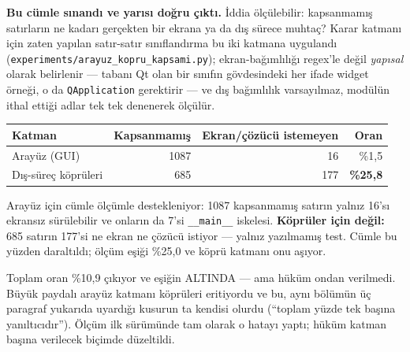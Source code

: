 \documentclass[11pt,a4paper]{article}
\begin{document}
\textbf{Bu cümle sınandı ve yarısı doğru çıktı.} İddia ölçülebilir: kapsanmamış
satırların ne kadarı gerçekten bir ekrana ya da dış sürece muhtaç? Karar katmanı
için zaten yapılan satır-satır sınıflandırma bu iki katmana uygulandı
(\texttt{experiments/arayuz\_kopru\_kapsami.py}); ekran-bağımlılığı regex'le
değil \emph{yapısal} olarak belirlenir --- tabanı Qt olan bir sınıfın gövdesindeki
her ifade widget örneği, o da \texttt{QApplication} gerektirir --- ve dış
bağımlılık varsayılmaz, modülün ithal ettiği adlar tek tek denenerek ölçülür.

\begin{center}\footnotesize
\begin{tabular}{@{}lrrr@{}}
\toprule
\textbf{Katman} & \textbf{Kapsanmamış} & \textbf{Ekran/çözücü istemeyen} & \textbf{Oran} \\
\midrule
Arayüz (GUI) & 1087 & 16 & \%1{,}5 \\
Dış-süreç köprüleri & 685 & 177 & \textbf{\%25{,}8} \\
\bottomrule
\end{tabular}
\end{center}

\noindent Arayüz için cümle ölçümle destekleniyor: 1087 kapsanmamış
satırın yalnız 16'sı ekransız sürülebilir ve onların da
7'si \texttt{\_\_main\_\_} iskelesi.
\textbf{Köprüler için değil:} 685 satırın 177'si ne
ekran ne çözücü istiyor --- yalnız yazılmamış test. Cümle bu yüzden
daraltıldı; ölçüm eşiği \%25{,}0 ve köprü katmanı onu aşıyor.

\noindent Toplam oran \%10{,}9 çıkıyor ve eşiğin ALTINDA ---
ama hüküm ondan verilmedi. Büyük paydalı arayüz katmanı köprüleri eritiyordu ve
bu, aynı bölümün üç paragraf yukarıda uyardığı kusurun ta kendisi olurdu
(``toplam yüzde tek başına yanıltıcıdır''). Ölçüm ilk sürümünde tam olarak o
hatayı yaptı; hüküm katman başına verilecek biçimde düzeltildi.
\end{document}
